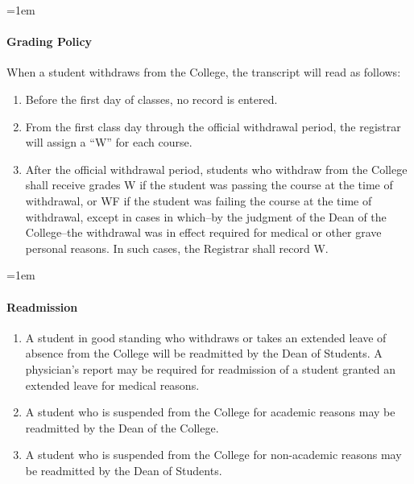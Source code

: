 \documentclass{manual}
\newcommand{\modified}[1]{}
\newcommand{\oldbreak}[1]{}
\let\oldparagraph\paragraph
\renewcommand\paragraph{\leftskip=1em\oldparagraph}
\begin{document}
\paragraph{Grading Policy}

When a student withdraws from the College, the transcript will read as follows:

\begin{enumerate}[label=\alph*)]

\item Before the first day of classes, no record is entered.

\item From the first class day through the official withdrawal period, the registrar will assign a ``W'' for each course.

\oldbreak{IX-2}

\item After the official withdrawal period, students who withdraw from the College shall \modified{2/12/02 } receive grades W if the student was passing the course at the time of withdrawal, or WF if the student was failing the course at the time of withdrawal, except in cases in which--by the judgment of the Dean of the College--the withdrawal was in effect required for medical or other grave personal reasons. In such cases, the Registrar shall record W.

\end{enumerate}

\paragraph{Readmission}
\begin{enumerate}[label=\alph*)]
\item A student in good standing who withdraws or takes an extended leave of absence from the College will be readmitted by the Dean of Students. A physician's report may be required for readmission of a student granted an extended leave for medical reasons.

\item A student who is suspended from the College for academic reasons may be readmitted by the Dean of the College.

\item A student who is suspended from the College for non-academic reasons may be readmitted by the Dean of Students.
\end{enumerate}

\oldbreak{IX-3}
\end{document}
